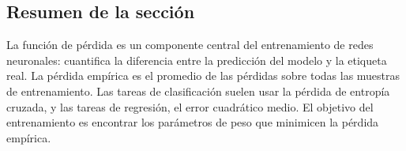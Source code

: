 \subsection{Resumen de la sección}

La función de pérdida es un componente central del entrenamiento de redes neuronales: cuantifica la diferencia entre la predicción del modelo y la etiqueta real. La pérdida empírica es el promedio de las pérdidas sobre todas las muestras de entrenamiento. Las tareas de clasificación suelen usar la pérdida de entropía cruzada, y las tareas de regresión, el error cuadrático medio. El objetivo del entrenamiento es encontrar los parámetros de peso que minimicen la pérdida empírica.

